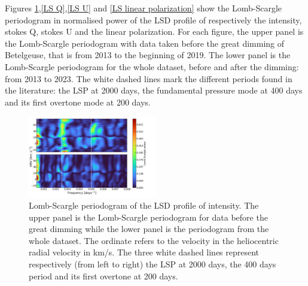 \documentclass{aa}
\begin{document}

Figures \ref{LS intensity},\ref{LS Q},\ref{LS U} and \ref{LS linear polarization} show the Lomb-Scargle periodogram in normalised power of the LSD profile of respectively 
the intensity, stokes Q, stokes U and the linear polarization. 
For each figure, the upper panel is the Lomb-Scargle periodogram with data taken before the great dimming of Betelgeuse, that is from 2013 to the beginning of 2019. 
The lower panel is the Lomb-Scargle periodogram for the whole dataset, before and after the dimming: from 2013 to 2023. The white dashed lines mark the different 
periods found in the literature: the LSP at 2000 days, the fundamental pressure mode at 400 days and its first overtone mode at 200 days.  

\begin{figure}[!h]
    \centering
    \includegraphics[width=0.5\textwidth]{Lomb-Scargle Intensity.png}
    \caption{Lomb-Scargle periodogram of the LSD profile of intensity. 
    The upper panel is the Lomb-Scargle periodogram for data before the great dimming while the lower panel is the periodogram from the whole dataset.
    The ordinate refers to the velocity in the heliocentric radial velocity in km/s.
    The three white dashed lines represent respectively (from left to right) the LSP at 2000 days, the 400 days period and its first overtone at 200 days.  }
    \label{LS intensity}
\end{figure}
\end{document}
